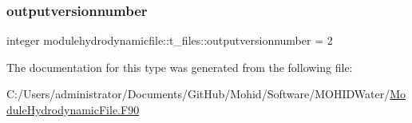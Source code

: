 \subsubsection{\texorpdfstring{outputversionnumber}{outputversionnumber}}
{\footnotesize\ttfamily integer modulehydrodynamicfile\+::t\+\_\+files\+::outputversionnumber = 2\hspace{0.3cm}{\ttfamily [private]}}



The documentation for this type was generated from the following file\+:\begin{DoxyCompactItemize}
\item 
C\+:/\+Users/administrator/\+Documents/\+Git\+Hub/\+Mohid/\+Software/\+M\+O\+H\+I\+D\+Water/\mbox{\hyperlink{_module_hydrodynamic_file_8_f90}{Module\+Hydrodynamic\+File.\+F90}}\end{DoxyCompactItemize}
